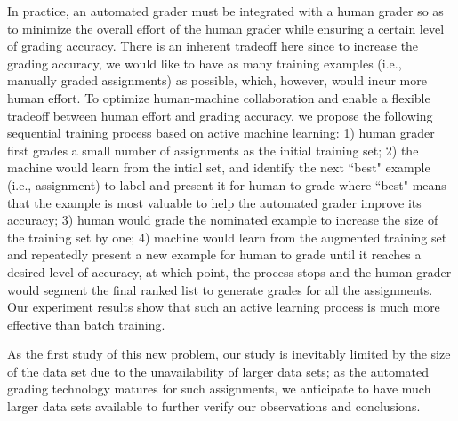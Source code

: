 In practice, an automated grader must be integrated with a human grader so as to minimize the overall effort of the human grader while ensuring a certain level of grading accuracy. There is an inherent tradeoff here since to increase the grading accuracy, we would like to have as many training examples (i.e., manually graded assignments) as possible, which, however, would incur more human effort. To optimize human-machine collaboration and enable a flexible tradeoff between human effort and grading accuracy, we propose the following sequential
training process based on active machine learning: 1) human grader first grades a small number of assignments as the initial training set; 2) the machine would learn from the intial set, and identify the next ``best" example (i.e., assignment) to label and present it for human to grade where ``best" means that the example is most valuable to help the automated grader improve its accuracy; 3) human would grade the nominated example to increase the size of the training set by one; 4) machine would learn from the augmented training set and repeatedly present a new example for human to grade until it reaches a desired level of accuracy, at which point, the process stops and the human grader would segment the final ranked list to generate grades for all the assignments. Our experiment results show that such an active learning process is much more effective than batch training. 

As the first study of this new problem, our study is inevitably limited by
the size of the data set due to the unavailability of larger data sets; as the automated grading technology matures for
such assignments, we anticipate to have much larger data sets available to
further verify our observations and conclusions.
